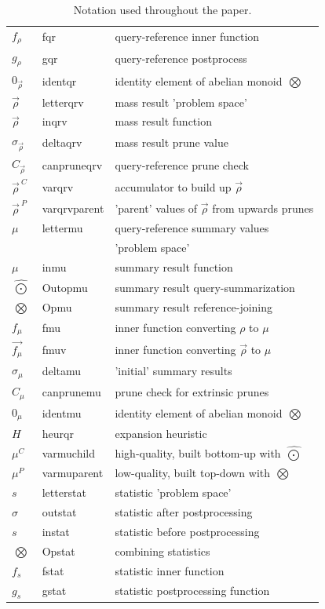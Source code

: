 \documentclass[twoside,leqno,twocolumn]{article}
\newcommand{\summary}{\hat{\sigma}}
\newcommand{\nameOp}[2]{\mathop{#1\nolimits\!\!_{#2}}}
\newcommand{\myOp}[1]{\nameOp{\bigotimes}{#1}}
\newcommand{\letterqr}{\rho}
\newcommand{\inqr}{\rho}
\newcommand{\Opqr}{\myOp{\letterqr}}
\newcommand{\fqr}{f_{\!\letterqr}}
\newcommand{\gqr}{g_{\!\letterqr}}
\newcommand{\letterqrv}{\vec{\rho}}
\newcommand{\inqrv}{\vec{\rho}}
\newcommand{\deltaqrv}{\summary_{\!\letterqrv}}
\newcommand{\canpruneqrv}{C_{\!\letterqrv}}
\newcommand{\identqr}{0_{\!\letterqrv}}
\newcommand{\varqrv}{\letterqrv^{\:C\!}}
\newcommand{\varqrvparent}{\letterqrv^{\:P\!}}
\newcommand{\lettermu}{\mu}
\newcommand{\inmu}{\mu}
\newcommand{\Outopmu}{\widehat{\nameOp{\bigodot}{\lettermu}}}%
\newcommand{\Opmu}{\myOp{\lettermu}}
\newcommand{\fmu}{f_{\!\lettermu}}
\newcommand{\fmuv}{\vec{f_{\!\lettermu}}}
\newcommand{\deltamu}{\summary_{\!\lettermu}}
\newcommand{\canprunemu}{C_{\!\lettermu}}
\newcommand{\heurqr}{H}
\newcommand{\identmu}{0_{\lettermu}}
\newcommand{\varmuchild}{\lettermu^{\!C}}
\newcommand{\varmuparent}{\lettermu^{\!P}}
\newcommand{\letterstat}{s}
\newcommand{\outstat}{\sigma}
\newcommand{\instat}{s}
\newcommand{\Opstat}{\myOp{\letterstat}}
\newcommand{\fstat}{f_{\!\letterstat}}
\newcommand{\gstat}{g_{\!\letterstat}}
\begin{document}
\begin{appendix}
\begin{table}
\begin{tabular}{|l|l|l|}
\\ $\fqr$ & fqr & query-reference inner function
\\ $\gqr$ & gqr & query-reference postprocess
\\ $\identqr$ & identqr & identity element of abelian monoid $\Opqr$
\\ $\letterqrv$ & letterqrv & mass result 'problem space'
\\ $\inqrv$ & inqrv & mass result function
\\ $\deltaqrv$ & deltaqrv & mass result prune value
\\ $\canpruneqrv$ & canpruneqrv & query-reference prune check
\\ $\varqrv$ & varqrv & accumulator to build up $\inqrv$
\\ $\varqrvparent$ & varqrvparent & 'parent' values of $\inqrv$ from upwards prunes
\\ \hline $\lettermu$ & lettermu & query-reference summary values
\\ && 'problem space'
\\ $\inmu$ & inmu & summary result function
\\ $\Outopmu$ & Outopmu & summary result query-summarization
\\ $\Opmu$ & Opmu & summary result reference-joining
\\ $\fmu$ & fmu & inner function converting $\inqr$ to $\inmu$
\\ $\fmuv$ & fmuv & inner function converting $\inqrv$ to $\inmu$
\\ $\deltamu$ & deltamu & 'initial' summary results
\\ $\canprunemu$ & canprunemu & prune check for extrinsic prunes
\\ $\identmu$ & identmu & identity element of abelian monoid $\Opmu$
\\ $\heurqr$ & heurqr & expansion heuristic
\\ $\varmuchild$ & varmuchild & high-quality, built bottom-up with $\Outopmu$
\\ $\varmuparent$ & varmuparent & low-quality, built top-down with $\Opmu$
\\ \hline $\letterstat$ & letterstat & statistic 'problem space'
\\ $\outstat$ & outstat & statistic after postprocessing
\\ $\instat$ & instat & statistic before postprocessing
\\ $\Opstat$ & Opstat & combining statistics
\\ $\fstat$ & fstat & statistic inner function
\\ $\gstat$ & gstat & statistic postprocessing function
\\ \hline
\end{tabular}
\caption{Notation used throughout the paper.}
\label{tab:notation}
\end{table}


\end{appendix}
\end{document}
